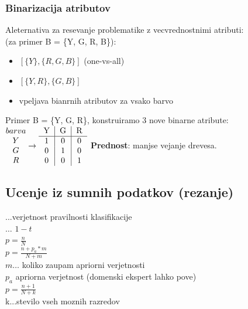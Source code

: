 \subsubsection{Binarizacija atributov}
Aleternativa za resevanje problematike z vecvrednostnimi atributi:\\
 (za primer B = \{Y, G, R, B\}):
\begin{itemize}[leftmargin=*,topsep=0pt,noitemsep]
    \item $\left[\{Y \}, \{R, G, B \} \right]$ (one-vs-all)
    \item $\left[\{Y, R\}, \{G, B\}\right]$ 
    \item vpeljava bianrnih atributov za vsako barvo
\end{itemize}
Primer B = \{Y, G, R\}, konstruiramo 3 nove binarne atribute:\\
$ \begin{matrix} barva \\ Y \\ G \\ R \end{matrix} \rightarrow \begin{tabular}{c|c|c} Y & G & R \\ \hline 1 & 0 & 0 \\ 0 & 1 & 0 \\ 0 & 0 & 1\end{tabular}$
\textbf{Prednost}: manjse vejanje drevesa.


\subsection{Ucenje iz sumnih podatkov (rezanje)}
...verjetnost pravilnosti klasifikacije\\
 $\dots$ $1-t$\\
 $p=\frac{n}{N}$\\
 $p=\frac{n + p_a * m}{N+m}$\\
$m \dots$ koliko zaupam apriorni verjetnosti\\
$p_a$ apriorna verjetnost (domenski ekspert lahko pove)\\
 $p=\frac{n+1}{N+k}$\\
k...stevilo vseh moznih razredov

